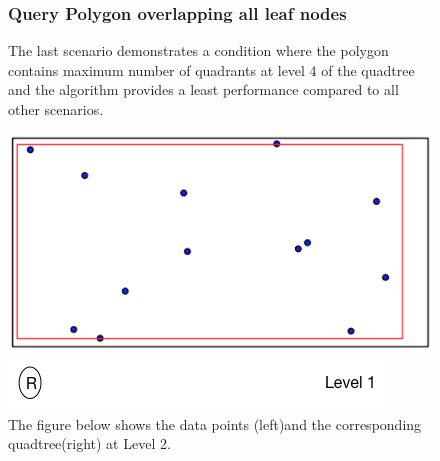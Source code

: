 \documentclass{article}
\begin{document}
\clearpage
\begin{figure}
\subsubsection{Query Polygon overlapping all leaf nodes}
The last scenario demonstrates a condition where the polygon contains maximum number of quadrants at level 4 of the quadtree and the algorithm provides a least performance compared to all other scenarios.

\caption{The figure below shows the data points (left)and the corresponding quadtree(right) at Level 2.}
  \centering
  \begin{minipage}[b]{0.35\textwidth}
    \includegraphics[width=\textwidth]{4Quad1_1}  
  \end{minipage}
  \hfill
  \begin{minipage}[b]{0.6\textwidth}
    \includegraphics[width=\textwidth]{1_1Quad_1_tree}
  \end{minipage}
\end{figure}
\end{document}
